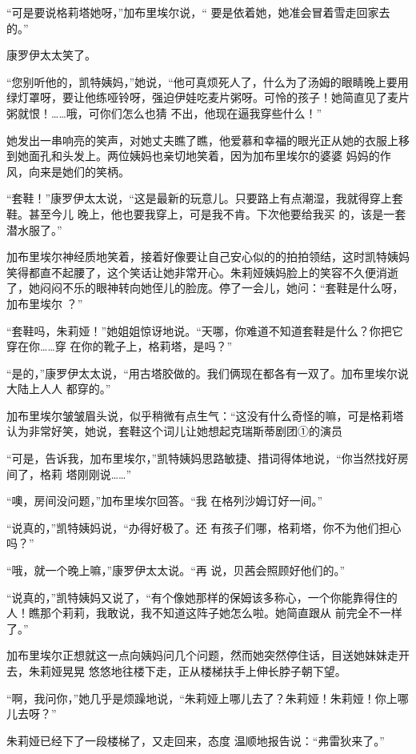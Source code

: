\documentclass{article}
\begin{document}
“可是要说格莉塔她呀，”加布里埃尔说，“
要是依着她，她准会冒着雪走回家去的。” 


康罗伊太太笑了。 

“您别听他的，凯特姨妈，”她说，“他可真烦死人了，什么为了汤姆的眼睛晚上要用绿灯罩呀，要让他练哑铃呀，强迫伊娃吃麦片粥呀。可怜的孩子！她简直见了麦片粥就恨！……哦，可你们怎么也猜
不出，他现在逼我穿些什么！” 

她发出一串响亮的笑声，对她丈夫瞧了瞧，他爱慕和幸福的眼光正从她的衣服上移到她面孔和头发上。两位姨妈也亲切地笑着，因为加布里埃尔的婆婆
妈妈的作风，向来是她们的笑柄。 

“套鞋！”康罗伊太太说，“这是最新的玩意儿。只要路上有点潮湿，我就得穿上套鞋。甚至今儿
\newpage
晚上，他也要我穿上，可是我不肯。下次他要给我买
的，该是一套潜水服了。” 

加布里埃尔神经质地笑着，接着好像要让自己安心似的的拍拍领结，这时凯特姨妈笑得都直不起腰了，这个笑话让她非常开心。朱莉娅姨妈脸上的笑容不久便消逝了，她闷闷不乐的眼神转向她侄儿的脸庞。停了一会儿，她问：“套鞋是什么呀，加布里埃尔
？” 

“套鞋吗，朱莉娅！”她姐姐惊讶地说。“天哪，你难道不知道套鞋是什么？你把它穿在你……穿
在你的靴子上，格莉塔，是吗？” 

“是的，”康罗伊太太说，“用古塔胶做的。我们俩现在都各有一双了。加布里埃尔说大陆上人人
都穿的。” 

加布里埃尔皱皱眉头说，似乎稍微有点生气：“这没有什么奇怪的嘛，可是格莉塔认为非常好笑，她说，套鞋这个词儿让她想起克瑞斯蒂剧团①的演员
\newpage


“可是，告诉我，加布里埃尔，”凯特姨妈思路敏捷、措词得体地说，“你当然找好房间了，格莉
塔刚刚说……” 

“噢，房间没问题，”加布里埃尔回答。“我
在格列沙姆订好一间。” 

“说真的，”凯特姨妈说，“办得好极了。还
有孩子们哪，格莉塔，你不为他们担心吗？” 

“哦，就一个晚上嘛，”康罗伊太太说。“再
说，贝茜会照顾好他们的。” 

“说真的，”凯特姨妈又说了，“有个像她那样的保姆该多称心，一个你能靠得住的人！瞧那个莉莉，我敢说，我不知道这阵子她怎么啦。她简直跟从
前完全不一样了。” 

加布里埃尔正想就这一点向姨妈问几个问题，然而她突然停住话，目送她妹妹走开去，朱莉娅晃晃
\newpage
悠悠地往楼下走，正从楼梯扶手上伸长脖子朝下望。

“啊，我问你，”她几乎是烦躁地说，“朱莉娅上哪儿去了？朱莉娅！朱莉娅！你上哪儿去呀？”

朱莉娅已经下了一段楼梯了，又走回来，态度
温顺地报告说：“弗雷狄来了。” 
\end{document}
